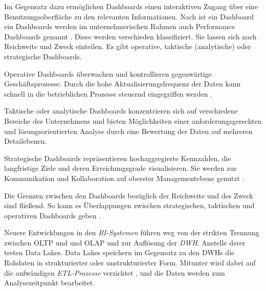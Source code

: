 Im Gegensatz dazu ermöglichen Dashboards einen interaktiven Zugang über eine Benutzungsoberfläche zu den relevanten Informationen.
Nach  ist ein Dashboard ein  \cite[26]{few_information_2006} Dashboards werden im unternehmerischen Rahmen auch Performance Dashboards genannt \cite[vgl.][154]{linden_geschaftsmodellbasierte_2016}.
Diese werden verschieden klassifiziert. Sie lassen sich nach Reichweite und Zweck einteilen. Es gibt operative, taktische (analytische) oder strategische Dashboards. 


Operative Dashboards überwachen und kontrollieren gegenwärtige Geschäftsprozesse. Durch die hohe Aktualisierungsfrequenz der Daten kann schnell in 
die betrieblichen Prozesse steuernd eingegriffen werden \cites[vgl.][S. 11 f.;]{eckerson_performance_2011}[vgl.][S. 30 f.]{few_information_2006}.


Taktische oder analytische Dashboards konzentrieren sich auf verschiedene Bereiche des Unternehmens 
und bieten Möglichkeiten einer anforderungsgerechten und lösungsorientierten Analyse durch eine Bewertung der Daten auf mehreren Detailebenen. 


Strategische Dashboards repräsentieren hochaggregierte Kennzahlen, die langfristige Ziele und deren Erreichungsgrade visualisieren. 
Sie werden zur Kommunikation und Kollaboration auf oberster Managementebene genutzt \cite[vgl.][S. 155 f.]{linden_geschaftsmodellbasierte_2016}. 


Die Grenzen zwischen den Dashboards bezüglich der Reichweite und des Zweck sind fließend. 
So kann es Überlappungen zwischen strategischen, taktischen und operativen Dashboards geben \cite[vgl.][121]{eckerson_performance_2011}.


Neuere Entwicklungen in den \textit{\acrshort{BI}-Systemen} führen weg von der strikten Trennung zwischen \acrshort{OLTP} und und \acrshort{OLAP} und zur Auflösung der \textit{\acrshort{DWH}}. 
Anstelle derer treten Data Lakes. Data Lakes speichern im Gegensatz zu den \acrlong{DWH}s die Rohdaten in strukturierter oder unstrukturierter Form. 
Mitunter wird dabei auf die aufwändigen \textit{\acrshort{ETL}-Prozesse} verzichtet \cite[vgl.][86]{gronwald_integrierte_2020}, und die Daten werden zum Analysezeitpunkt bearbeitet.


